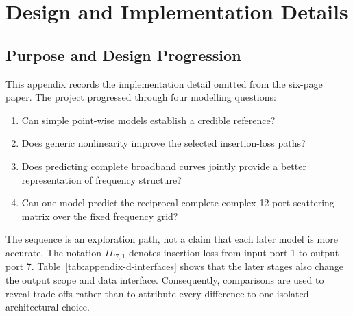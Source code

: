 \section{Design and Implementation Details}
\label{app:design-implementation}

\subsection{Purpose and Design Progression}
This appendix records the implementation detail omitted from the six-page
paper. The project progressed through four modelling questions:

\begin{enumerate}
    \item Can simple point-wise models establish a credible reference?
    \item Does generic nonlinearity improve the selected insertion-loss paths?
    \item Does predicting complete broadband curves jointly provide a better
          representation of frequency structure?
    \item Can one model predict the reciprocal complete complex 12-port
          scattering matrix over the fixed frequency grid?
\end{enumerate}

The sequence is an exploration path, not a claim that each later model is more
accurate. The notation $IL_{7,1}$ denotes insertion loss from input port 1 to
output port 7. Table~\ref{tab:appendix-d-interfaces} shows that the later stages
also change the output scope and data interface. Consequently, comparisons are
used to reveal trade-offs rather than to attribute every difference to one
isolated architectural choice.

